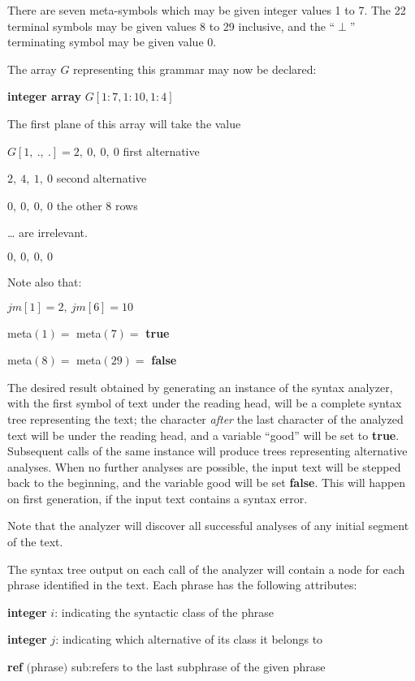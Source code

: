 \noindent
There are seven meta-symbols which may be given integer values 1 to 7. The 22 terminal symbols may be given values 8 to 29 inclusive, and the ``$\perp$'' terminating symbol may be given value 0.

The array $G$ representing this grammar may now be declared:

\quad \textbf{integer array} $G[1:7, 1:10, 1:4]$

\noindent
The first plane of this array will take the value

\quad $G[1,\ .,\ .] = 2,\ 0,\ 0,\ 0$\tabto*{12em} first alternative

\tabto*{7.4em}$2,\ 4,\ 1,\ 0$\tabto*{12em} second alternative

\tabto*{7.4em}$0,\ 0,\ 0,\ 0$\tabto*{12em} the other 8 rows

\tabto*{7.4em}\quad\dots\tabto*{12em} are irrelevant.

\tabto*{7.4em}$0,\ 0,\ 0,\ 0$

\noindent
Note also that:

\quad $jm[1] = 2,\ jm[6] = 10$

\quad meta$(1) =$ meta$(7) =$ \textbf{true}

\quad meta$(8) =$ meta$(29) =$ \textbf{false}

The desired result obtained by generating an instance of the syntax analyzer, with the first symbol of text under the reading head, will be a complete syntax tree representing the text; the character \textit{after} the last character of the analyzed text will be under the reading head, and a variable ``good'' will be set to \textbf{true}. Subsequent calls of the same instance will produce trees representing alternative analyses. When no further analyses are possible, the input text will be stepped back to the beginning, and the variable good will be set \textbf{false}. This will happen on first generation, if the input text contains a syntax error.

Note that the analyzer will discover all successful analyses of any initial segment of the text.

The syntax tree output on each call of the analyzer will contain a node for each phrase identified in the text. Each phrase has the following attributes:

\quad \textbf{integer} $i$: indicating the syntactic class of the phrase

\quad \textbf{integer} $j$: indicating which alternative of its class it belongs to

\quad \textbf{ref} $($phrase$)$ sub:refers to the last subphrase of the given phrase

